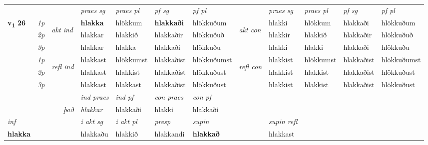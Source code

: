 \begin{longtable}[l]{X>{\footnotesize\itshape}llXXXXlXXXX}
\midrule

 & &   & \textit{praes sg}  & \textit{praes pl}    & \textit{ pf sg} & \textit{pf pl} & & \textit{praes sg}  & \textit{praes pl}    & \textit{pf sg} & \textit{pf pl }  \\ \cmidrule{4-7} \cmidrule{9-12}
 \multirow{2}{*}{{{\textbf{v{\textsubscript{1}}} \Large{\textbf{26}}}}}  & 1p & \multirow{3}{*}{\begin{turn}{90}\textit{akt ind}\end{turn}} & \textbf{hlakka} & hlökkum & \textbf{hlakkaði} & hlökkuðum & \multirow{3}{*}{\begin{turn}{90}\textit{akt con}\end{turn}} &hlakki & hlökkum & hlakkaði & hlökkuðum\\*
 & 2p &  &  hlakkar  & hlakkið & hlakkaðir & hlökkuðuð & & hlakkir & hlakkið & hlakkaðir & hlökkuðuð \\*
 & 3p &  & hlakkar & hlakka & hlakkaði & hlökkuðu & & hlakki & hlakki& hlakkaði & hlökkuðu \\*
\cmidrule{4-7} \cmidrule{9-12}
 & 1p & \multirow{3}{*}{\begin{turn}{90}\textit{refl ind}\end{turn}}  & hlakkast & hlökkumst & hlakkaðist & hlökkuðumst & \multirow{3}{*}{\begin{turn}{90}\textit{refl con}\end{turn}}  &hlakkist & hlökkumst & hlakkaðist & hlökkuðumst \\*
 & 2p &  & hlakkast & hlakkist & hlakkaðist & hlökkuðust & &hlakkist & hlakkist & hlakkaðist & hlökkuðust \\*
 & 3p  & & hlakkast & hlakkast & hlakkaðist & hlökkuðust & & hlakkist & hlakkist& hlakkaðist & hlökkuðust \\*
\cmidrule{4-7} \cmidrule{9-12}

   && &  \textit{ind praes} & \textit{ind pf} & \textit{con praes} & \textit{con pf} \\*
\multicolumn{3}{r}{\textit{það}} & hlakkar & hlakkaði & hlakki & hlakkaði \\*

\cmidrule{4-7}
   {\textit{inf}} & &  & \textit{i akt sg} & \textit{i akt pl}   & \textit{presp} & \textit{supin} && \textit{supin refl}  \\*
  {\textbf{hlakka}} & && hlakkaðu  & hlakkið   & hlakkandi &  \textbf{hlakkað} && hlakkast  \\*

\midrule


\end{longtable}
